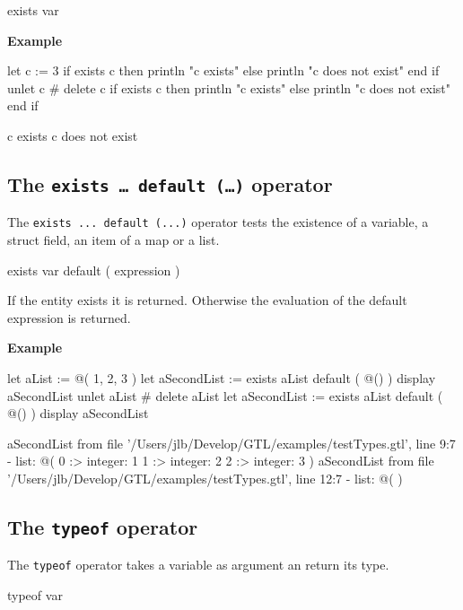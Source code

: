 \documentclass[10pt,openright,twosides]{report}
\newcommand{\gtlinline}[1]{\colorbox{light-blue}{\lstinline[language=gtl]{#1}}}
\newcommand{\example}{\vspace{.75em}\noindent\textbf{Example}\vspace{0em}}
\begin{document}
\begin{gtl}
exists var
\end{gtl}

\example
\begin{gtl}
let c := 3
if exists c then println "c exists" else println "c does not exist" end if
unlet c # delete c
if exists c then println "c exists" else println "c does not exist" end if
\end{gtl}
\begin{console}
c exists
c does not exist
\end{console}

\subsection{The \texttt{exists \ldots{} default (\ldots)} operator}

The \gtlinline{exists ... default (...)} operator tests the existence of a variable, a struct field,  an item of a map or a list.

\begin{gtl}
exists var default ( expression )
\end{gtl}

If the entity exists it is returned. Otherwise the evaluation of the default expression is returned.

\example
\begin{gtl}
let aList := @( 1, 2, 3 )
let aSecondList := exists aList default ( @() )
display aSecondList
unlet aList # delete aList
let aSecondList := exists aList default ( @() )
display aSecondList
\end{gtl}
\begin{console}
aSecondList from file '/Users/jlb/Develop/GTL/examples/testTypes.gtl', line 9:7
  - list: @(
    0 :>
        integer: 1
    1 :>
        integer: 2
    2 :>
        integer: 3
)
aSecondList from file '/Users/jlb/Develop/GTL/examples/testTypes.gtl', line 12:7
  - list: @(
)
\end{console}

\subsection{The \texttt{typeof} operator}

The \gtlinline{typeof} operator takes a variable as argument an return its type.

\begin{gtl}
typeof var
\end{gtl}
\end{document}
